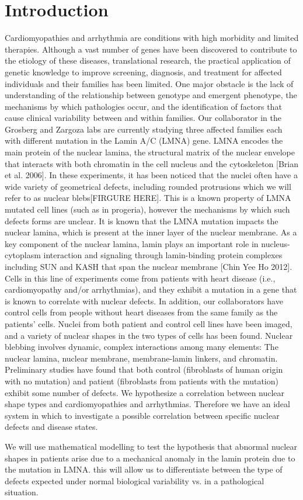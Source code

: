 \section{Introduction}
Cardiomyopathies and arrhythmia are conditions with high morbidity and limited therapies. Although a vast number of genes have been discovered to contribute to the etiology of these diseases, translational research, the practical application of genetic knowledge to improve screening, diagnosis, and treatment for affected individuals and their families has been limited. One major obstacle is the lack of understanding of the relationship between genotype and emergent phenotype, the mechanisms by which pathologies occur, and the identification of factors that cause clinical variability between and within families. Our collaborator in the Grosberg and Zargoza labs are currently studying three affected families each with different mutation in the Lamin A/C (LMNA) gene.  LMNA encodes the main protein of the nuclear lamina, the structural matrix of the nuclear envelope that interacts with both chromatin in the cell nucleus and the cytoskeleton [Brian et al. 2006]. In these experiments, it has been noticed that the nuclei often have a wide variety of geometrical defects, including rounded protrusions which we will refer to as nuclear blebs[FIRGURE HERE]. This is a known property of LMNA mutated cell lines (such as in progeria), however the mechanisms by which such defects forms are unclear. It is known that the LMNA mutation impacts the nuclear lamina, which is present at the inner layer of the nuclear membrane. As a key component of the nuclear lamina, lamin plays an important role in nucleus-cytoplasm interaction and signaling through lamin-binding protein complexes including SUN and KASH that span the nuclear membrane [Chin Yee Ho 2012]. Cells in this line of experiments come from patients with heart disease (i.e., cardiomyopathy and/or arrhythmias), and they exhibit a mutation in a gene that is known to correlate with nuclear defects. In addition, our collaborators have control cells from people without heart diseases from the same family as the patients' cells.  Nuclei from both patient and control cell lines have been imaged, and  a variety of nuclear shapes in the two types of cells has been found. Nuclear blebbing involves dynamic, complex interactions among many elements: The nuclear lamina, nuclear membrane, membrane-lamin linkers, and chromatin. Preliminary studies have found that both control (fibroblasts of human origin with no mutation) and patient (fibroblasts from patients with the mutation) exhibit some number of defects. We hypothesize a correlation between nuclear shape types and cardiomyopathies and arrhythmias. Therefore we have an ideal system in which to investigate a possible correlation between specific nuclear defects and disease states.

We will use mathematical modelling to test the hypothesis that abnormal nuclear shapes in patients arise due to a mechanical anomaly in the lamin protein due to the mutation in LMNA. this will allow us to differentiate between the type of defects expected under normal biological variability vs. in a pathological situation. 